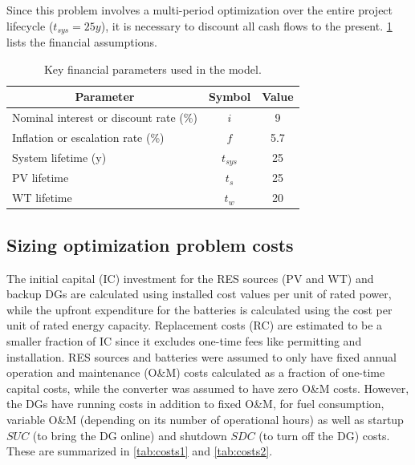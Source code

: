 \documentclass[final,3p,times]{elsarticle}
\begin{document}
Since this problem involves a multi-period optimization over the entire project lifecycle ($t_{sys} = 25 y$), it is necessary to discount all cash flows to the present. \cref{tab:financial} lists the financial assumptions.

\begin{table}[htbp]
\centering
\begin{tabular}{@{}lcc@{}}
\toprule
\multicolumn{1}{c}{\textbf{Parameter}} & \textbf{Symbol}      & \textbf{Value}       \\ \midrule
Nominal interest or discount rate (\%) & $i$                    & 9 \cite{interest_rate}                   \\
Inflation or escalation rate (\%)                    & $f$                    & 5.7 \cite{inflation_rate}                 \\
System lifetime (y)                    & $t_{sys}$           & 25   \\
PV lifetime & $t_s$ & 25 \\
WT lifetime & $t_w$ & 20 \\
\bottomrule
\end{tabular}
\caption{Key financial parameters used in the model.}
\label{tab:financial} 
\end{table}

\subsection{Sizing optimization problem costs}

The initial capital (IC) investment for the RES sources (PV and WT) and backup DGs are calculated using installed cost values per unit of rated power, while the upfront expenditure for the batteries is calculated using the cost per unit of rated energy capacity. Replacement costs (RC) are estimated to be a smaller fraction of IC since it excludes one-time fees like permitting and installation. RES sources and batteries were assumed to only have fixed annual operation and maintenance (O\&M) costs calculated as a fraction of one-time capital costs, while the converter was assumed to have zero O\&M costs. However, the DGs have running costs in addition to fixed O\&M, for fuel consumption, variable O\&M (depending on its number of operational hours) as well as startup $SUC$ (to bring the DG online) and shutdown $SDC$ (to turn off the DG) costs. These are summarized in \cref{tab:costs1} and \cref{tab:costs2}. 
\end{document}
